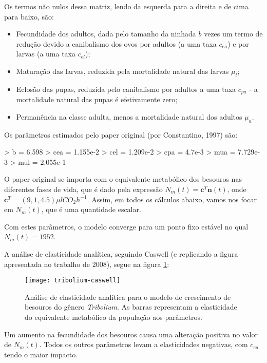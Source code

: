\documentclass[12pt,a4paper]{article}
\begin{document}
Os termos n\~ao nulos dessa matriz, lendo da esquerda para a direita e de cima para baixo, s\~ao:
\begin{itemize}
	\item Fecundidade dos adultos, dada pelo tamanho da ninhada $b$ vezes um termo de redu\c c\~ao
		devido a canibalismo dos ovos por adultos (a uma taxa $c_{ea}$) e por larvas (a uma taxa $c_{el}$);
	\item Matura\c c\~ao das larvas, reduzida pela mortalidade natural das larvas $\mu_l$;
	\item Eclos\~ao das pupas, reduzida pelo canibalismo por adultos a uma taxa $c_{pa}$ - a mortalidade
		natural das pupas \'e efetivamente zero;
	\item Perman\^encia na classe adulta, menos a mortalidade natural dos adultos $\mu_a$.
\end{itemize}

Os par\^ametros estimados pelo paper original (por Constantino, 1997) s\~ao:

\begin{Schunk}
\begin{Sinput}
> b = 6.598
> cea = 1.155e-2
> cel = 1.209e-2
> cpa = 4.7e-3
> mua = 7.729e-3
> mul = 2.055e-1
\end{Sinput}
\end{Schunk}


O paper original se importa com o equivalente metab\'olico dos besouros nas diferentes fases de vida,
que \'e dado pela express\~ao $N_m(t) = \mathbf{c}^T\mathbf{n}(t)$, onde $\mathbf{c}^T = ( 9, 1,  4.5)
\mu l CO_2h^{-1}$. 
Assim, em todos os c\'alculos abaixo, vamos nos focar em $N_m(t)$, que \'e uma quantidade escalar.

Com estes par\^ametros, o modelo converge para um ponto fixo est\'avel no qual $N_m(t) = 1952$.

A an\'alise de elasticidade anal\'itica, seguindo Caswell 
(e replicando a figura apresentada no trabalho de 2008), segue na figura \ref{analitico}:

\begin{figure}[h!]
\texttt{[image: tribolium-caswell]}
	\caption{An\'alise de elasticidade anal\'itica para o modelo de
	crescimento de besouros do g\^enero {\em Tribolium}. As barras
	representam a elasticidade do equivalente metab\'olico da 
	popula\c c\~ao aos par\^ametros.}
	\label{analitico}
\end{figure}

Um aumento na fecundidade dos besouros causa uma altera\c c\~ao 
positiva no valor de $N_m(t)$. Todos os outros par\^ametros levam
a elasticidades negativas, com $c_{ea}$ tendo o maior impacto.
\end{document}
